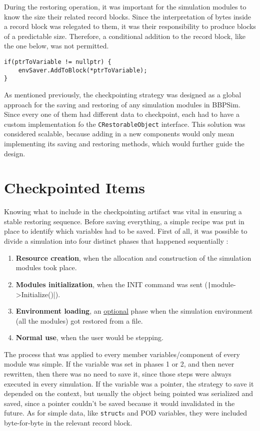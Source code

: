 {During the restoring operation, it was important for the simulation modules to know the size their related record blocks. Since the interpretation of bytes inside a record block was relegated to them, it was their responsibility to produce blocks of a predictable size. Therefore, a conditional addition to the record block, like the one below, was not permitted.
\begin{verbatim}
if(ptrToVariable != nullptr) {
	envSaver.AddToBlock(*ptrToVariable);
}
\end{verbatim}

As mentioned previously, the checkpointing strategy was designed as a global approach for the saving and restoring of any simulation modules in \gls{BBPSim}. Since every one of them had different data to checkpoint, each had to have a custom implementation fo the \texttt{CRestorableObject} interface. This solution was considered scalable, because adding in a new components would only mean implementing its saving and restoring methods, which would further guide the design.

\section{Checkpointed Items}
Knowing what to include in the checkpointing artifact was vital in ensuring a stable restoring sequence. Before saving everything, a simple recipe was put in place to identify which variables had to be saved. First of all, it was possible to divide a simulation into four distinct phases that happened sequentially :
\begin{enumerate}
	\item \textbf{Resource creation}, when the allocation and construction of the simulation modules took place.
	\item \textbf{Modules initialization}, when the INIT command was sent (\texttt|module->Initialize()|).
	\item \textbf{Environment loading}, an \ul{optional} phase when the simulation environment (all the modules) got restored from a file.
	\item \textbf{Normal use}, when the user would be stepping. 
\end{enumerate}

The process that was applied to every member variables/component of every module was simple. If the variable was set in phases 1 or 2, and then never rewritten, then there was no need to save it, since those steps were always executed in every simulation. If the variable was a pointer, the strategy to save it depended on the context, but usually the object being pointed was serialized and saved, since a pointer couldn't be saved because it would invalidated in the future. As for simple data, like \texttt{struct}s and \gls{POD} variables, they were included byte-for-byte in the relevant record block.

}
